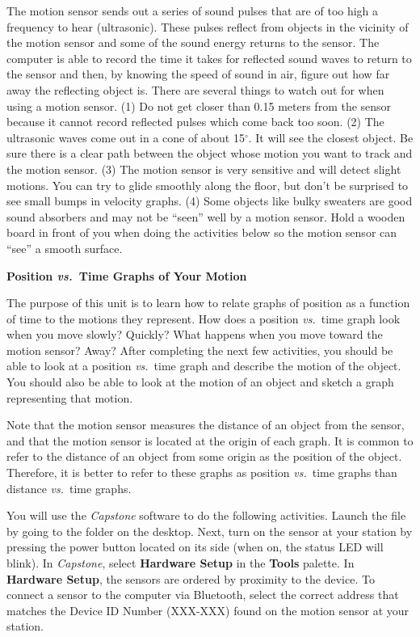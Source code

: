 The motion sensor sends out a series of sound pulses that are of
too high a frequency to hear (ultrasonic). These pulses reflect from objects in the vicinity
of the motion sensor and some of the sound energy returns to the sensor.
The computer is able to record the time it takes for reflected sound waves to
return to the sensor and then, by knowing the speed of sound in air, figure
out how far away the reflecting object is. There are several things to watch
out for when using a motion sensor. (1) Do not get closer than 0.15 meters
from the sensor because it cannot record reflected pulses which come back
too soon. (2) The ultrasonic waves come out in a cone of about 15\( ^{\circ } \).
It will see the closest object. Be sure there is a clear path between the object
whose motion you want to track and the motion sensor. (3) The motion sensor
is very sensitive and will detect slight motions. You can try to glide smoothly
along the floor, but don't be surprised to see small bumps in velocity graphs.
(4) Some objects like bulky sweaters are good sound absorbers and may not be
``seen'' well by a motion sensor. Hold a wooden board in front of you when 
doing the activities below so the motion sensor can ``see'' a smooth surface.

\textbf{Position \textit{vs.}~Time Graphs of Your Motion }

The purpose of this unit is to learn how to relate graphs of position as a function
of time to the motions they represent. How does a position \textit{vs.}~time graph look
when you move slowly? Quickly? What happens when you move toward the motion
sensor? Away? After completing the next few activities, you should be able
to look at a position \textit{vs.}~time graph and describe the motion of the object.
You should also be able to look at the motion of an object and sketch a graph
representing that motion.

Note that the motion sensor measures the distance of an object from the sensor,
and that the motion sensor is located at the origin of each graph. It is common
to refer to the distance of an object from some origin as the position of the
object. Therefore, it is better to refer to these graphs as position \textit{vs.}~time
graphs than distance \textit{vs.}~time graphs.

You will use the \textit{Capstone} software to do the following activities.
Launch the  file by going to the \filename{\coursefolder} folder on the desktop. Next, turn on the sensor at your station by pressing the power button located on its side (when on, the status LED will blink). In \textit{Capstone}, select \textbf{Hardware Setup} in the \textbf{Tools} palette. In \textbf{Hardware Setup}, the sensors are ordered by
proximity to the device. To connect a sensor to the computer via Bluetooth, select the correct address that matches the Device ID Number (XXX-XXX) found on the motion sensor at your station.  
 
